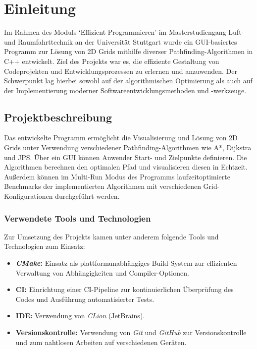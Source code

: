 \chapter{Einleitung}
\label{ch:einleitung}
Im Rahmen des Moduls `Effizient Programmieren' im Masterstudiengang Luft- und Raumfahrttechnik an der Universität Stuttgart
wurde ein \ac{GUI}-basiertes Programm zur Lösung von 2D Grids mithilfe diverser Pathfinding-Algorithmen in C++ entwickelt.
Ziel des Projekts war es, die effiziente Gestaltung von Codeprojekten und Entwicklungsprozessen zu erlernen und anzuwenden.
Der Schwerpunkt lag hierbei sowohl auf der algorithmischen Optimierung als auch auf der Implementierung moderner Softwareentwicklungsmethoden und -werkzeuge.
\section{Projektbeschreibung}
\label{sec:beschreibung}
Das entwickelte Programm ermöglicht die Visualisierung und Lösung von 2D Grids unter Verwendung verschiedener Pathfinding-Algorithmen wie A*, Dijkstra und \ac{JPS}.
Über ein \ac{GUI} können Anwender Start- und Zielpunkte definieren.
Die Algorithmen berechnen den optimalen Pfad und visualisieren diesen in Echtzeit.
Außerdem können im Multi-Run Modus des Programms laufzeitoptimierte Benchmarks der implementierten Algorithmen mit verschiedenen Grid-Konfigurationen durchgeführt werden.
\subsection*{Verwendete Tools und Technologien}
Zur Umsetzung des Projekts kamen unter anderem folgende Tools und Technologien zum Einsatz:
\begin{itemize}
\item \textbf{\textit{CMake}:} Einsatz als plattformunabhängiges Build-System zur effizienten Verwaltung von Abhängigkeiten und Compiler-Optionen.
\item \textbf{\ac{CI}:} Einrichtung einer CI-Pipeline zur kontinuierlichen Überprüfung des Codes und Ausführung automatisierter Tests.
\item \textbf{\ac{IDE}:} Verwendung von \textit{CLion} (JetBrains).
\item \textbf{Versionskontrolle:} Verwendung von \textit{Git} und \textit{GitHub} zur Versionskontrolle und zum nahtlosen Arbeiten auf verschiedenen Geräten.
\end{itemize}

